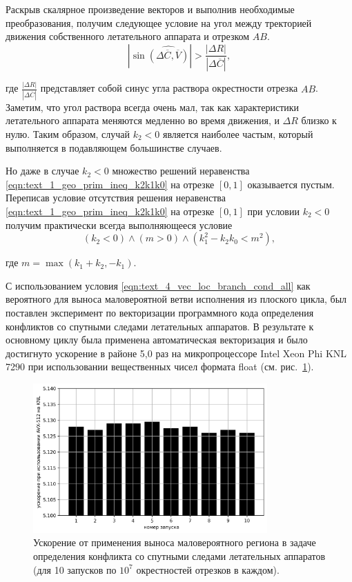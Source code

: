 Раскрыв скалярное произведение векторов и выполнив необходимые преобразования, получим следующее условие на угол между тректорией движения собственного летательного аппарата и отрезком $AB$.
\begin{equation}\label{eqn:text_4_vec_loc_branch_flight_cond}
	\left| \sin{\widehat{(\Delta \overline{C}, \overline{V})}} \right| > \frac{|\Delta R|}{|\Delta \overline{C}|},
\end{equation}

где $\frac{|\Delta R|}{|\Delta \overline{C}|}$ представляет собой синус угла раствора окрестности отрезка $AB$.
Заметим, что угол раствора всегда очень мал, так как характеристики летательного аппарата меняются медленно во время движения, и $\Delta R$ близко к нулю.
Таким образом, случай $k_2 < 0$ является наиболее частым, который выполняется в подавляющем большинстве случаев.

Но даже в случае $k_2 < 0$ множество решений неравенства \eqref{eqn:text_1_geo_prim_ineq_k2k1k0} на отрезке $[0, 1]$ оказывается пустым.
Переписав условие отсутствия решения неравенства \eqref{eqn:text_1_geo_prim_ineq_k2k1k0} на отрезке $[0, 1]$ при условии $k_2 < 0$ получим практически всегда выполняющееся условие
\begin{equation}\label{eqn:text_4_vec_loc_branch_cond_all}
	(k_2 < 0) \land (m > 0) \land (k_1^2 - k_2k_0 < m^2),
\end{equation}

где $m = \max(k_1 + k_2, -k_1)$.

С использованием условия \eqref{eqn:text_4_vec_loc_branch_cond_all} как вероятного для выноса маловероятной ветви исполнения из плоского цикла, был поставлен эксперимент по векторизации программного кода определения конфликтов со спутными следами летательных аппаратов.
В результате к основному циклу была применена автоматическая векторизация и было достигнуто ускорение в районе 5,0 раз на микропроцессоре Intel Xeon Phi KNL 7290 при использовании вещественных чисел формата float (см. рис.~\ref{fig:text_4_vec_loc_branch_res}).

\begin{figure}[ht]
	\centering
	\includegraphics[width=0.8\textwidth]{./pics/text_4_vec_loc_branch/res.png}
	\caption{Ускорение от применения выноса маловероятного региона в задаче определения конфликта со спутными следами летательных аппаратов (для 10 запусков по $10^7$ окрестностей отрезков в каждом).}
	\label{fig:text_4_vec_loc_branch_res}
\end{figure}

